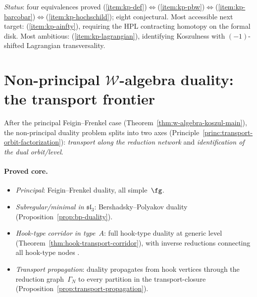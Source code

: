 \noindent
\emph{Status}: four equivalences proved
(\ref{item:kp-def})$\Leftrightarrow$(\ref{item:kp-pbw})$\Leftrightarrow$(\ref{item:kp-barcobar})$\Leftrightarrow$(\ref{item:kp-hochschild});
eight conjectural.  Most accessible next target:
(\ref{item:kp-ainfty}), requiring the HPL contracting
homotopy on the formal disk.  Most ambitious:
(\ref{item:kp-lagrangian}), identifying Koszulness with
$(-1)$-shifted Lagrangian transversality.


\section{Non-principal \texorpdfstring{$\mathcal{W}$}{W}-algebra
duality: the transport frontier}
\label{sec:concordance-non-principal-w}

After the principal Feigin--Frenkel case
(Theorem~\ref{thm:w-algebra-koszul-main}), the non-principal
duality problem splits into two axes
(Principle~\ref{princ:transport-orbit-factorization}):
\emph{transport along the reduction network} and
\emph{identification of the dual orbit/level}.

\paragraph{Proved core.}
\begin{itemize}
\item \emph{Principal}: Feigin--Frenkel duality, all simple~$\fg$.
\item \emph{Subregular/minimal in $\mathfrak{sl}_3$}:
  Bershadsky--Polyakov duality (Proposition~\ref{prop:bp-duality}).
\item \emph{Hook-type corridor in type~$A$}:
  full hook-type duality at generic level
  (Theorem~\ref{thm:hook-transport-corridor}), with inverse
  reductions connecting all hook-type nodes
  \cite{FehilyHook,CLNS24,CFLN24,GenraStages,ButsonNair}.
\item \emph{Transport propagation}: duality propagates from hook
  vertices through the reduction graph~$\Gamma_N$ to every
  partition in the transport-closure
  (Proposition~\ref{prop:transport-propagation}).
\end{itemize}

